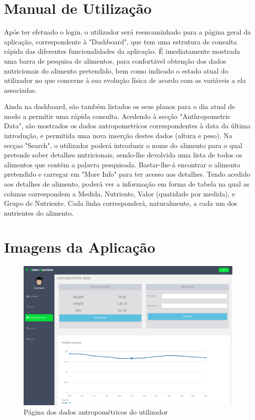 \documentclass[twocolumn,twoside,11pt,a4paper]{article}
\begin{document}
\onecolumn
\section{Manual de Utilização}
Após ter efetuado o login, o utilizador será reencaminhado para a página geral da aplicação, correspondente à "Dashboard", que tem uma estrutura de consulta rápida das diferentes funcionalidades da aplicação.
É imediatamente mostrada uma barra de pesquisa de alimentos, para confortável obtenção dos dados nutricionais do alimento pretendido, bem como indicado o estado atual do utilizador no que concerne à sua evolução física de acordo com as variáveis a ela associadas.

Ainda na dashboard, são também listados os seus planos para o dia atual de modo a permitir uma rápida consulta.
Acedendo à secção "Anthropometric Data", são mostrados os dados antropometricos correspondentes à data da última introdução, e permitida uma nova inserção destes dados (altura e peso). 
Na secçao "Search", o utilizador poderá introduzir o nome do alimento para o qual pretende saber detalhes nutricionais, sendo-lhe devolvida uma lista de todos os alimentos que contêm a palavra pesquisada. Bastar-lhe-á encontrar o alimento pretendido e carregar em "More Info" para ter acesso aos detalhes.
Tendo acedido aos detalhes de alimento, poderá ver a informação em forma de tabela na qual as colunas correspondem a Medida, Nutriente, Valor (quatidade por medida), e Grupo de Nutriente. Cada linha corresponderá, naturalmente, a cada um dos nutrientes do alimento.

\onecolumn
\section{Imagens da Aplicação}

\clearpage

\begin{figure}
\includegraphics[scale=0.38]{antropometricos}
\caption{Página dos dados antropométricos do utilizador}
\label{fig:antropometricos}
\end{figure}
\end{document}
